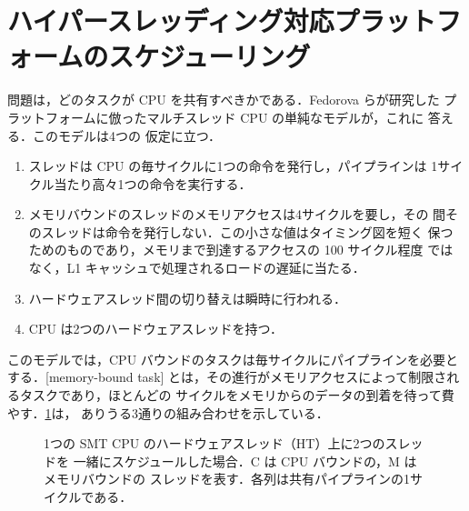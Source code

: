 \documentclass[../main.tex]{subfiles}
\begin{document}
\section{ハイパースレッディング対応プラットフォームのスケジューリング}
\label{sec:l07-smt-sched}

問題は，どのタスクが CPU を共有すべきかである．Fedorova らが研究した
プラットフォームに倣ったマルチスレッド CPU の単純なモデルが，これに
答える．このモデルは4つの
仮定に立つ．
\begin{enumerate}
  \item スレッドは CPU の毎サイクルに1つの命令を発行し，パイプラインは
    1サイクル当たり高々1つの命令を実行する．
  \item メモリバウンドのスレッドのメモリアクセスは4サイクルを要し，その
    間そのスレッドは命令を発行しない．この小さな値はタイミング図を短く
    保つためのものであり，メモリまで到達するアクセスの 100 サイクル程度
    ではなく，L1 キャッシュで処理されるロードの遅延に当たる．
  \item ハードウェアスレッド間の切り替えは瞬時に行われる．
  \item CPU は2つのハードウェアスレッドを持つ．
\end{enumerate}
このモデルでは，CPU バウンドのタスクは毎サイクルにパイプラインを必要と
する．[memory-bound task]
とは，その進行がメモリアクセスによって制限されるタスクであり，ほとんどの
サイクルをメモリからのデータの到着を待って費やす．\cref{fig:l07-smt}は，
ありうる3通りの組み合わせを示している．

\begin{figure}[htbp]
  \centering
  
  \caption{1つの SMT CPU のハードウェアスレッド（HT）上に2つのスレッドを
    一緒にスケジュールした場合．C は CPU バウンドの，M はメモリバウンドの
    スレッドを表す．各列は共有パイプラインの1サイクルである．}
  \label{fig:l07-smt}
\end{figure}
\end{document}
